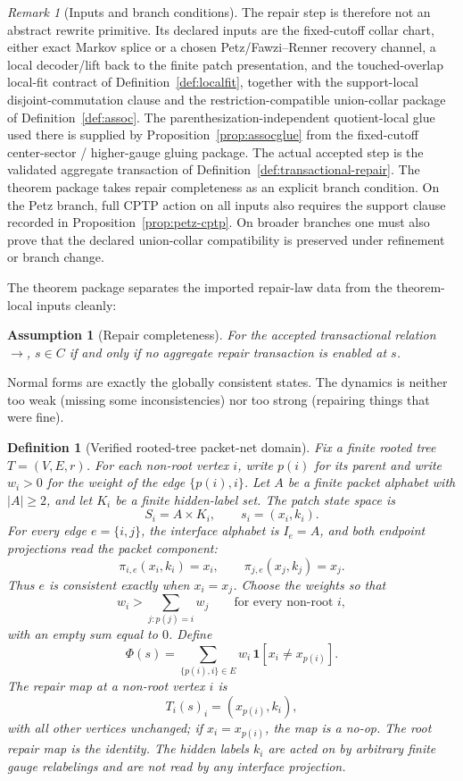 \documentclass[11pt]{article}
\newtheorem{definition}[theorem]{Definition}
\newtheorem{assumption}[theorem]{Assumption}
\theoremstyle{remark}
\newtheorem{remark}[theorem]{Remark}
\theoremstyle{plain}
\begin{document}
\begin{remark}[Inputs and branch conditions]\label{rem:repair-burdens}
The repair step is therefore not an abstract rewrite primitive. Its declared inputs are the
fixed-cutoff collar chart, either exact Markov splice or a chosen Petz/Fawzi--Renner recovery
channel, a local decoder/lift back to the finite patch presentation, and the touched-overlap
local-fit contract of Definition~\ref{def:localfit}, together with the support-local
disjoint-commutation clause and the restriction-compatible union-collar package of
Definition~\ref{def:assoc}. The
parenthesization-independent quotient-local glue used there is supplied by
Proposition~\ref{prop:assocglue} from the fixed-cutoff center-sector / higher-gauge gluing
package. The actual accepted step is the validated aggregate transaction of
Definition~\ref{def:transactional-repair}. The theorem package takes repair completeness as an
explicit branch condition. On the Petz branch, full CPTP action on all inputs also requires the support clause
recorded in Proposition~\ref{prop:petz-cptp}. On broader branches one must also prove that
the declared union-collar compatibility is preserved under refinement or branch change.
\end{remark}

The theorem package separates the imported repair-law data from the theorem-local inputs cleanly:

\begin{assumption}[Repair completeness]\label{ass:complete}
For the accepted transactional relation \(\to\), \(s\in C\) if and only if no aggregate repair
transaction is enabled at \(s\).
\end{assumption}

Normal forms are exactly the globally consistent states. The dynamics is neither too weak (missing some inconsistencies) nor too strong (repairing things that were fine).

\begin{definition}[Verified rooted-tree packet-net domain]\label{def:tree-packet-domain}
Fix a finite rooted tree \(T=(V,E,r)\). For each non-root vertex \(i\), write \(p(i)\) for its
parent and write \(w_i>0\) for the weight of the edge \(\{p(i),i\}\). Let \(A\) be a finite
packet alphabet with \(|A|\ge2\), and let \(K_i\) be a finite hidden-label set. The patch state
space is
\[
S_i=A\times K_i,
\qquad
s_i=(x_i,k_i).
\]
For every edge \(e=\{i,j\}\), the interface alphabet is \(I_e=A\), and both endpoint projections
read the packet component:
\[
\pi_{i,e}(x_i,k_i)=x_i,
\qquad
\pi_{j,e}(x_j,k_j)=x_j.
\]
Thus \(e\) is consistent exactly when \(x_i=x_j\). Choose the weights so that
\[
w_i>\sum_{j:p(j)=i}w_j
\qquad
\text{for every non-root } i,
\]
with an empty sum equal to \(0\). Define
\[
\Phi(s)=\sum_{\{p(i),i\}\in E}w_i\,\mathbf 1[x_i\ne x_{p(i)}].
\]
The repair map at a non-root vertex \(i\) is
\[
T_i(s)_i=(x_{p(i)},k_i),
\]
with all other vertices unchanged; if \(x_i=x_{p(i)}\), the map is a no-op. The root repair map is
the identity. The hidden labels \(k_i\) are acted on by arbitrary finite gauge relabelings and are
not read by any interface projection.
\end{definition}
\end{document}
